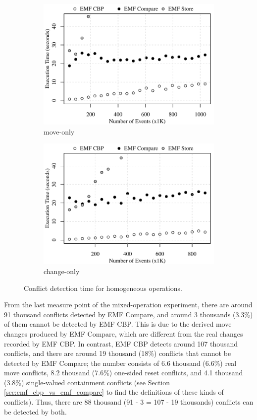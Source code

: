 \begin{figure}[ht]
\begin{subfigure}[t]{0.490\linewidth}
    \includegraphics[width=\linewidth]{move-conflict-time-events}
    \caption{move-only}
    \label{fig:move-conflict-time-events}
  \end{subfigure}
  \hfill
  \begin{subfigure}[t]{0.490\linewidth}
    \includegraphics[width=\linewidth]{change-conflict-time-events}
    \caption{change-only}
    \label{fig:change-conflict-time-events}
  \end{subfigure}
  \caption{Conflict detection time for homogeneous operations.}
  \label{fig:homgeneous_operation_time_events}
\end{figure}

From the last measure point of the mixed-operation experiment, there are around 91 thousand conflicts detected by EMF Compare, and around 3 thousands (3.3\%) of them cannot be detected by EMF CBP. This is due to the derived move changes produced by EMF Compare, which are different from the real changes recorded by EMF CBP. In contrast, EMF CBP detects around 107 thousand conflicts, and there are around 19 thousand (18\%) conflicts that cannot be detected by EMF Compare; the number consists of 6.6 thousand (6.6\%) real move conflicts, 8.2  thousand (7.6\%) one-sided reset conflicts, and 4.1 thousand (3.8\%) single-valued containment conflicts (see Section \ref{sec:emf_cbp_vs_emf_compare} to find the definitions of these kinds of conflicts). Thus, there are 88 thousand (91 - 3 = 107 - 19 thousands) conflicts can be detected by both.

